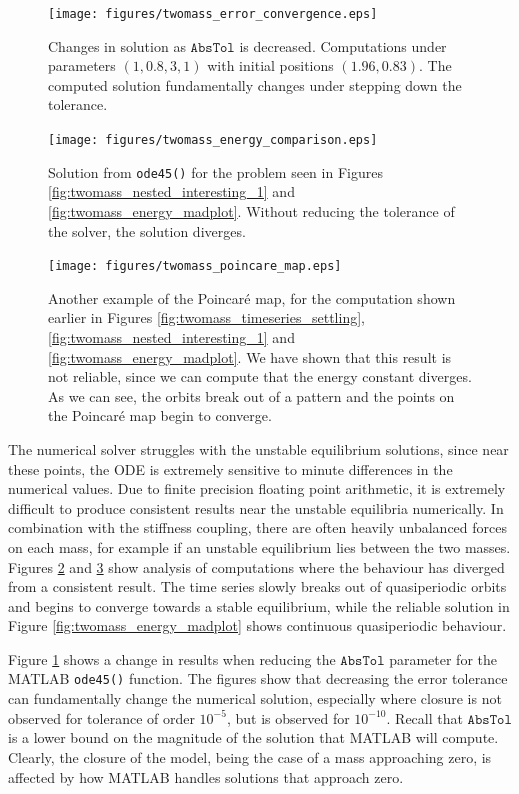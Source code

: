 \documentclass{report}
\begin{document}
\begin{figure}
	\centering
	\texttt{[image: figures/twomass\_error\_convergence.eps]}
	\caption{
		Changes in solution as \(\mathtt{AbsTol}\) is decreased.
		Computations under parameters \((1, 0.8, 3, 1)\) with initial positions \((1.96, 0.83)\).
		The computed solution fundamentally changes under stepping down the tolerance.   
	}
	\label{fig:twomass_stepping_tolerance}
\end{figure}

\begin{figure}
	\centering
	\texttt{[image: figures/twomass\_energy\_comparison.eps]}
	\caption{
		Solution from \texttt{ode45()} for the problem seen in Figures \ref{fig:twomass_nested_interesting_1} and \ref{fig:twomass_energy_madplot}.
		Without reducing the tolerance of the solver,
		the solution diverges.
	}
	\label{fig:twomass_energy_mistake}
\end{figure}

\begin{figure}
	\centering
	\texttt{[image: figures/twomass\_poincare\_map.eps]}
	\caption{
		Another example of the Poincar\'e map, for the computation shown earlier in Figures \ref{fig:twomass_timeseries_settling}, \ref{fig:twomass_nested_interesting_1} and \ref{fig:twomass_energy_madplot}.
		We have shown that this result is not reliable, since we can compute that the energy constant diverges.
		As we can see, the orbits break out of a pattern and the points on the Poincar\'e map begin to converge.
	}
	\label{fig:twomass_poincare_bad}
\end{figure}

The numerical solver struggles with the unstable equilibrium solutions,
since near these points, the ODE is extremely sensitive to minute differences in the numerical values.
Due to finite precision floating point arithmetic,
it is extremely difficult to produce consistent results near the unstable equilibria numerically.
In combination with the stiffness coupling, there are often heavily unbalanced forces on each mass,
for example if an unstable equilibrium lies between the two masses.
Figures \ref{fig:twomass_energy_mistake} and \ref{fig:twomass_poincare_bad} show analysis of computations where the behaviour has diverged from a consistent result.
The time series slowly breaks out of quasiperiodic orbits and begins to converge towards a stable equilibrium,
while the reliable solution in Figure \ref{fig:twomass_energy_madplot} shows continuous quasiperiodic behaviour.

Figure \ref{fig:twomass_stepping_tolerance} shows a change in results when reducing the $\mathtt{AbsTol}$ parameter for the MATLAB \texttt{ode45()} function.
The figures show that decreasing the error tolerance can fundamentally change the numerical solution,
especially where closure is not observed for tolerance of order $10^{-5}$,
but is observed for $10^{-10}$.
Recall that $\mathtt{AbsTol}$ is a lower bound on the magnitude of the solution that MATLAB will compute.
Clearly, the closure of the model, being the case of a mass approaching zero,
is affected by how MATLAB handles solutions that approach zero.
\end{document}
